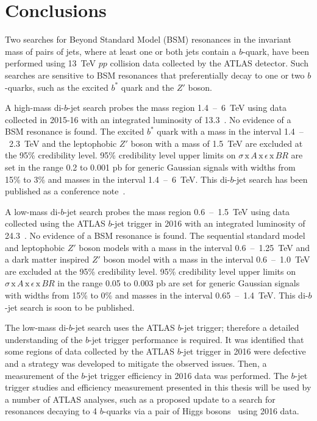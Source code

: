 \chapter{Conclusions}
\label{sec:conc}

Two searches for Beyond Standard Model (BSM) resonances in the invariant mass of pairs of jets,
where at least one or both jets contain a $b$-quark,
have been performed using 13~TeV $pp$ collision data collected by the ATLAS detector.
Such searches are sensitive to BSM resonances that preferentially decay to one or two $b$-quarks, such as the excited $b^*$ quark and the $Z'$ boson.


A high-mass di-$b$-jet search probes the mass region 1.4~--~6~TeV
using data collected in 2015-16 with an integrated luminosity of 13.3~\ifb{}.
No evidence of a BSM resonance is found.
The excited $b^*$ quark with a mass in the interval 1.4~--~2.3~TeV
and the leptophobic $Z'$ boson with a mass of 1.5~TeV are excluded at the 95\% credibility level.
95\% credibility level upper limits on $\sigma\,\text{x}\,\mathit{A}\,\text{x}\,\epsilon\,\text{x}\,\mathit{BR}$
are set in the range 0.2 to 0.001 pb for generic Gaussian signals with widths from 15\% to 3\% and masses in the interval 1.4~--~6~TeV.
This di-$b$-jet search has been published as a conference note~\cite{dibjet-ichep_conf}.

A low-mass di-$b$-jet search probes the mass region 0.6~--~1.5~TeV
using data collected using the ATLAS $b$-jet trigger in 2016 with an integrated luminosity of 24.3~\ifb{}.
No evidence of a BSM resonance is found.
The sequential standard model and leptophobic $Z'$  boson models with a mass in the interval 0.6~--~1.25~TeV
and a dark matter inspired $Z'$ boson model with a mass in the interval 0.6~--~1.0~TeV are excluded at the 95\% credibility level.
95\% credibility level upper limits on $\sigma\,\text{x}\,\mathit{A}\,\text{x}\,\epsilon\,\text{x}\,\mathit{BR}$ in the range 0.05 to 0.003 pb
are set for generic Gaussian signals with widths from 15\% to 0\% and masses in the interval 0.65~--~1.4~TeV.
This di-$b$-jet search is soon to be published.

The low-mass di-$b$-jet search uses the ATLAS $b$-jet trigger; therefore a detailed understanding of the $b$-jet trigger performance is required.
It was identified that some regions of data collected by the ATLAS $b$-jet trigger in 2016 were defective
and a strategy was developed to mitigate the observed issues.
Then, a measurement of the $b$-jet trigger efficiency in 2016 data was performed.
The $b$-jet trigger studies and efficiency measurement presented in this thesis will be used by a number of ATLAS analyses,
such as a proposed update to a search for resonances decaying to 4 $b$-quarks via a pair of Higgs bosons~\cite{trig-H4b} using 2016 data.

